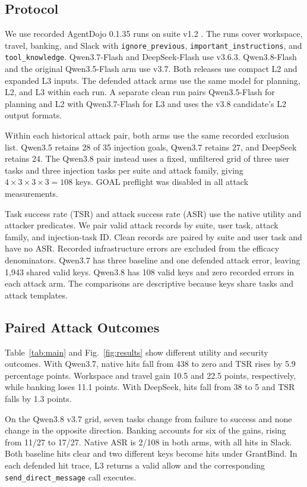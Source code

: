 \documentclass[conference]{IEEEtran}
\begin{document}
\subsection{Protocol}
We use recorded AgentDojo 0.1.35 runs on suite v1.2 \cite{agentdojo}. The runs cover workspace, travel, banking, and Slack with \texttt{ignore\_previous}, \texttt{important\_instructions}, and \texttt{tool\_knowledge}. Qwen3.7-Flash and DeepSeek-Flash use v3.6.3. Qwen3.8-Flash and the original Qwen3.5-Flash arm use v3.7. Both releases use compact L2 and expanded L3 inputs. The defended attack arms use the same model for planning, L2, and L3 within each run. A separate clean run pairs Qwen3.5-Flash for planning and L2 with Qwen3.7-Flash for L3 and uses the v3.8 candidate's L2 output formats.

Within each historical attack pair, both arms use the same recorded exclusion list. Qwen3.5 retains 28 of 35 injection goals, Qwen3.7 retains 27, and DeepSeek retains 24. The Qwen3.8 pair instead uses a fixed, unfiltered grid of three user tasks and three injection tasks per suite and attack family, giving $4\times3\times3\times3=108$ keys. GOAL preflight was disabled in all attack measurements.

Task success rate (TSR) and attack success rate (ASR) use the native utility and attacker predicates. We pair valid attack records by suite, user task, attack family, and injection-task ID. Clean records are paired by suite and user task and have no ASR. Recorded infrastructure errors are excluded from the efficacy denominators. Qwen3.7 has three baseline and one defended attack error, leaving 1,943 shared valid keys. Qwen3.8 has 108 valid keys and zero recorded errors in each attack arm. The comparisons are descriptive because keys share tasks and attack templates.

\subsection{Paired Attack Outcomes}
Table~\ref{tab:main} and Fig.~\ref{fig:results} show different utility and security outcomes. With Qwen3.7, native hits fall from 438 to zero and TSR rises by 5.9 percentage points. Workspace and travel gain 10.5 and 22.5 points, respectively, while banking loses 11.1 points. With DeepSeek, hits fall from 38 to 5 and TSR falls by 1.3 points.

On the Qwen3.8 v3.7 grid, seven tasks change from failure to success and none change in the opposite direction. Banking accounts for six of the gains, rising from 11/27 to 17/27. Native ASR is 2/108 in both arms, with all hits in Slack. Both baseline hits clear and two different keys become hits under GrantBind. In each defended hit trace, L3 returns a valid allow and the corresponding \texttt{send\_direct\_message} call executes.
\end{document}
